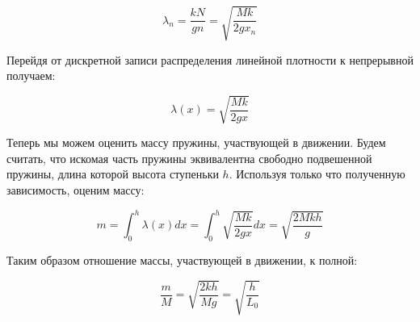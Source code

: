 \documentclass[a4paper, 12pt]{article}
\begin{document}
\bigskip

\begin{equation}
    \lambda_{n} = \frac{kN}{gn} = \sqrt{\frac{Mk}{2gx_{n}}}
\end{equation}

\bigskip

Перейдя от дискретной записи распределения линейной плотности к непрерывной получаем:

\bigskip

\begin{equation}
    \lambda(x) = \sqrt{\frac{Mk}{2gx}}
\end{equation}

\bigskip

Теперь мы можем оценить массу пружины, участвующей в движении. Будем считать, что искомая часть пружины эквивалентна свободно подвешенной пружины, длина которой высота ступеньки $ h $. Используя только что полученную зависимость, оценим массу:

\bigskip

\begin{equation}
    m = \int_{0}^{h} \lambda(x) dx = \int_{0}^{h} \sqrt{\frac{Mk}{2gx}} dx = \sqrt{\frac{2Mkh}{g}}     
\end{equation}

\bigskip

Таким образом отношение массы, участвующей в движении, к полной:

\bigskip

\begin{equation}
    \frac{m}{M} = \sqrt{\frac{2kh}{Mg}} = \sqrt{\frac{h}{L_{0}}}
\end{equation}
\end{document}

